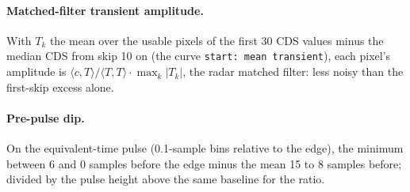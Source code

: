 \documentclass[10pt]{article}
\newcommand{\code}[1]{\texttt{#1}}
\renewcommand{\_}{\oldunderscore\allowbreak}
\begin{document}
\paragraph{Matched-filter transient amplitude.} With $T_k$ the mean over the usable pixels of the first 30 CDS values minus the median CDS from skip 10 on
(the curve \code{start: mean transient}), each pixel's amplitude is $\langle c, T\rangle/\langle T,T\rangle\cdot\max_k|T_k|$, the
radar matched filter: less noisy than the first-skip excess alone.

\paragraph{Pre-pulse dip.} On the equivalent-time pulse (0.1-sample bins relative to the edge), the minimum between 6 and 0
samples before the edge minus the mean 15 to 8 samples before; divided by the pulse height above the same baseline for the ratio.
\end{document}
